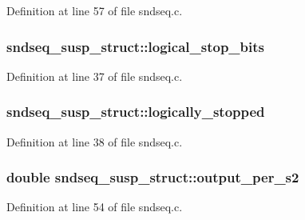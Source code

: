 Definition at line 57 of file sndseq.\+c.

\subsubsection[{\texorpdfstring{logical\+\_\+stop\+\_\+bits}{logical_stop_bits}}]{ sndseq\+\_\+susp\+\_\+struct\+::logical\+\_\+stop\+\_\+bits}\hypertarget{structsndseq__susp__struct_a5ec192e5b0a58d4f10cf16449885a5f0}{}\label{structsndseq__susp__struct_a5ec192e5b0a58d4f10cf16449885a5f0}


Definition at line 37 of file sndseq.\+c.

\subsubsection[{\texorpdfstring{logically\+\_\+stopped}{logically_stopped}}]{ sndseq\+\_\+susp\+\_\+struct\+::logically\+\_\+stopped}\hypertarget{structsndseq__susp__struct_adba55e0931a7d924aeda8516bd3cc9d6}{}\label{structsndseq__susp__struct_adba55e0931a7d924aeda8516bd3cc9d6}


Definition at line 38 of file sndseq.\+c.

\subsubsection[{\texorpdfstring{output\+\_\+per\+\_\+s2}{output_per_s2}}]{\setlength{\rightskip}{0pt plus 5cm}double sndseq\+\_\+susp\+\_\+struct\+::output\+\_\+per\+\_\+s2}\hypertarget{structsndseq__susp__struct_a8a95c278797322cb12beb29433187a61}{}\label{structsndseq__susp__struct_a8a95c278797322cb12beb29433187a61}


Definition at line 54 of file sndseq.\+c.

